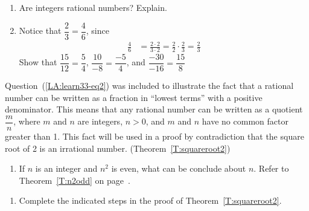 \begin{enumerate}

  \item Are integers rational numbers?  Explain.

  \item Notice that $\dfrac{2}{3} = \dfrac{4}{6}$, since
\begin{align*}
\frac{4}{6} &= \frac{2 \cdot 2}{3 \cdot 2} = \frac{2}{2} \cdot \frac{2}{3} = \frac{2}{3}
\end{align*}
Show that $\dfrac{15}{12} = \dfrac{5}{4}$, $\dfrac{10}{-8} = \dfrac{-5}{4}$, and $\dfrac{-30}{-16} = \dfrac{15}{8}$ \label{LA:learn33-eq2}%


\end{enumerate}
Question~(\ref{LA:learn33-eq2}) was included to illustrate the fact that a rational number can be written as a fraction in ``lowest terms'' with a positive denominator.  This means that any rational number can be written as a quotient $\dfrac{m}{n}$, where $m$ and $n$ are integers, $ n > 0 $, and $m$ and $n$ have no common factor greater than 1.  This fact will be used in a proof by contradiction that the square root of 2 is an irrational number.  (Theorem~\ref{T:squareroot2})

\setcounter{oldenumi}{\theenumi}
\begin{enumerate} \setcounter{enumi}{\theoldenumi}
  \item If $n$ is an integer and $n^2$ is even, what can be conclude about $n$.  Refer to Theorem~\ref{T:n2odd} on page~\pageref{T:n2odd}.
\end{enumerate}




\setcounter{oldenumi}{\theenumi}
\begin{enumerate} \setcounter{enumi}{\theoldenumi}
\item Complete the indicated steps in the proof of Theorem~\ref{T:squareroot2}.
\end{enumerate}


